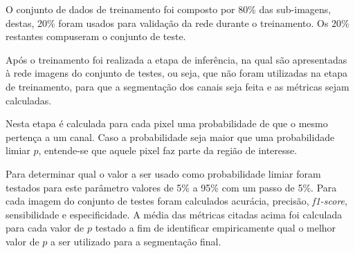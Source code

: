  O conjunto de dados de treinamento foi composto por 80\% das sub-imagens, destas, 20\% foram usados para validação da rede durante o treinamento. Os 20\% restantes compuseram o conjunto de teste.


 Após o treinamento foi realizada a etapa de inferência, na qual são apresentadas à rede imagens do conjunto de testes, ou seja, que não foram utilizadas na etapa de treinamento, para que a segmentação dos canais seja feita e as métricas sejam calculadas.

 Nesta etapa é calculada para cada pixel uma probabilidade de que o mesmo pertença a um canal. Caso a probabilidade seja maior que uma probabilidade limiar $p$, entende-se que aquele pixel faz parte da região de interesse.

 Para determinar qual o valor a ser usado como probabilidade limiar foram testados para este parâmetro  valores de 5\% a 95\% com um passo de 5\%. Para cada imagem do conjunto de testes foram calculados acurácia, precisão, \textit{f1-score}, sensibilidade e especificidade. A média das métricas citadas acima foi calculada para cada valor de $p$ testado a fim de identificar empiricamente qual o melhor valor de $p$ a ser utilizado para a segmentação final.

